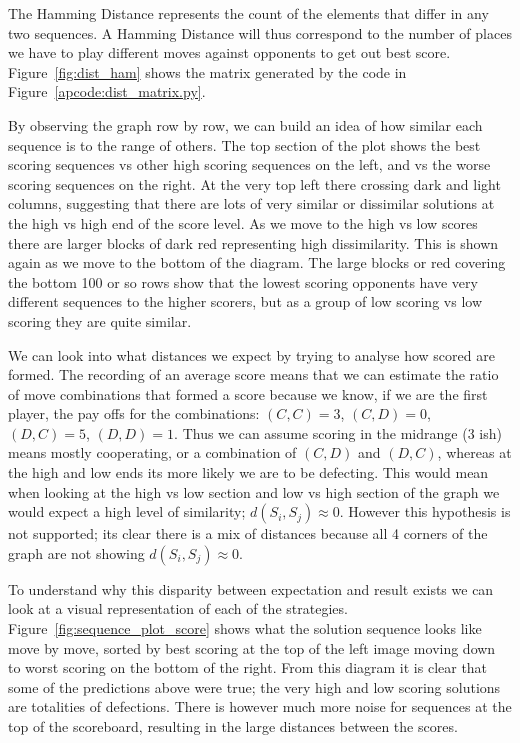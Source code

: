 The Hamming Distance represents the count of the elements that differ in any two sequences. 
A Hamming Distance will thus correspond to the number of places we have to play different moves against opponents to get out best score. 
Figure~\ref{fig:dist_ham} shows the matrix generated by the code in Figure~\ref{apcode:dist_matrix.py}.

By observing the graph row by row, we can build an idea of how similar each sequence is to the range of others.
The top section of the plot shows the best scoring sequences vs other high scoring sequences on the left, and vs the worse scoring sequences on the right. 
At the very top left there crossing dark and light columns, suggesting that there are lots of very similar or dissimilar solutions at the high vs high end of the score level.
As we move to  the high vs low scores there are larger blocks of dark red representing high dissimilarity.
This is shown again as we move to the bottom of the diagram.
The large blocks or red covering the bottom 100 or so rows show that the lowest scoring opponents have very different sequences to the higher scorers, but as a group of low scoring vs low scoring they are quite similar.

We can look into what distances we expect by trying to analyse how scored are formed.
The recording of an average score means that we can estimate the ratio of move combinations that formed a score because we know, if we are the first player, the pay offs for the combinations: $(C,C)=3$, $(C,D)=0$, $(D,C)=5$, $(D,D)=1$.
Thus we can assume scoring in the midrange ($3$ ish) means mostly cooperating, or a combination of $(C,D)$ and $(D,C)$, whereas at the high and low ends its more likely we are to be defecting.
This would mean when looking at the high vs low section and low vs high section of the graph we would expect a high level of similarity; $d(S_i,S_j)\approx 0$.
However this hypothesis is not supported; its clear there is a mix of distances because all 4 corners of the graph are not showing $d(S_i,S_j)\approx 0$. 

To understand why this disparity between expectation and result exists we can look at a visual representation of each of the strategies.
Figure~\ref{fig:sequence_plot_score} shows what the solution sequence looks like move by move, sorted by best scoring at the top of the left image moving down to worst scoring on the bottom of the right.
From this diagram it is clear that some of the predictions above were true; the very high and low scoring solutions are totalities of defections.
There is however much more noise for sequences at the top of the scoreboard, resulting in the large distances between the scores.


